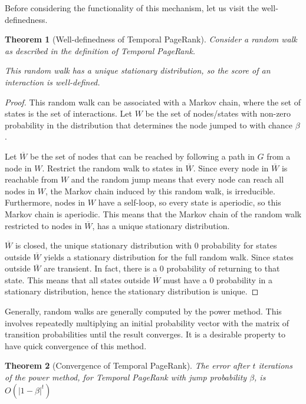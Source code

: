\documentclass[a4paper,11pt]{book}
\newcommand{\ov}{\overline}
\newtheorem{theorem}{Theorem}
\theoremstyle{definition}
\begin{document}
Before considering the functionality of this mechanism, let us visit the well-definedness.

\begin{theorem}[Well-definedness of Temporal PageRank]
    Consider a random walk as described in the definition of Temporal PageRank.

    This random walk has a unique stationary distribution, so the score of an interaction is well-defined.
    \label{thm:well_defined}
\end{theorem}
\begin{proof}
    This random walk can be associated with a Markov chain, where the set of states is the set of
    interactions. Let $W$ be the set of nodes/states with non-zero probability in the distribution
    that determines the node jumped to with chance $\beta$.

    Let $\ov{W}$ be the set of nodes that can be reached by following a path in $G$ from a node
    in $W$. Restrict the random walk to states in $\ov{W}$. Since every node in $\ov{W}$ is reachable
    from $W$ and the random jump means that every node can reach all nodes in $W$, the Markov chain
    induced by this random walk, is irreducible. Furthermore, nodes in $W$ have a self-loop, so every
    state is aperiodic, so this Markov chain is aperiodic. This means that the Markov chain of the
    random walk restricted to nodes in $\ov{W}$, has a unique stationary distribution.

    $\ov{W}$ is closed, the unique stationary distribution with $0$ probability for states outside
    $\ov{W}$ yields a stationary distribution for the full random walk. Since states
    outside $\ov{W}$ are transient. In fact, there is a $0$ probability of returning to that
    state. This means that all states outside $\ov{W}$ must have a $0$ probability in a stationary
    distribution, hence the stationary distribution is unique.
\end{proof}

Generally, random walks are generally computed by the power method. This involves repeatedly
multiplying an initial probability vector with the matrix of transition probabilities until
the result converges. It is a desirable property to have quick convergence of this method.

\begin{theorem}[Convergence of Temporal PageRank]
    The error after $t$ iterations of the power method, for Temporal PageRank with
    jump probability $\beta$, is $O(|1-\beta|^t)$
    \label{thm:conv_tpr}
\end{theorem}
\end{document}
